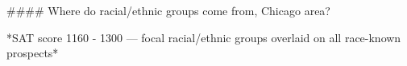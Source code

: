 #### Where do racial/ethnic groups come from, Chicago area?

*SAT score 1160 - 1300 — focal racial/ethnic groups overlaid on all race-known prospects*
